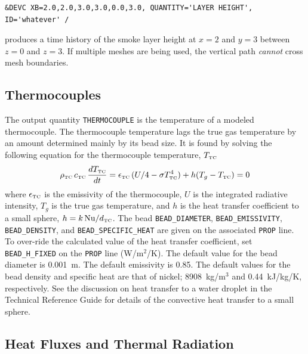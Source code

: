 \documentclass[11pt]{book}
\newcommand{\ct}{\tt\small}
\newcommand{\be}{\begin{equation}}
\newcommand{\ee}{\end{equation}}
\newcommand{\NU}{\hbox{Nu}}
\begin{document}
\footnotesize
\begin{verbatim}
&DEVC XB=2.0,2.0,3.0,3.0,0.0,3.0, QUANTITY='LAYER HEIGHT', ID='whatever' /
\end{verbatim}
\normalsize

\noindent
produces a time history of the smoke layer height at $x=2$ and $y=3$ between $z=0$ and $z=3$.
If multiple meshes are being used, the vertical path {\em cannot} cross mesh boundaries.



\subsection{Thermocouples}
\label{info:THERMOCOUPLE}

The output quantity {\ct THERMOCOUPLE} is the temperature of a modeled thermocouple. The thermocouple temperature lags the true gas temperature by an amount determined mainly
by its bead size. It is found by solving the following equation for the thermocouple temperature, $T_{\hbox{\tiny TC}}$~\cite{Welsh:1}
\be
   \rho_{\hbox{\tiny TC}} \, c_{\hbox{\tiny TC}} \, \frac{dT_{\hbox{\tiny TC}}}{dt} = \epsilon_{\hbox{\tiny TC}} \, (U/4 - \sigma T_{\hbox{\tiny TC}}^4) + h(T_g - T_{\hbox{\tiny TC}}) = 0
   \label{TC}
\ee
where $\epsilon_{\hbox{\tiny TC}}$ is the emissivity of the thermocouple, $U$ is the integrated radiative intensity, $T_g$ is the true gas temperature, and
$h$ is the heat transfer coefficient to a small sphere,
$h=k \, \NU / d_{\hbox{\tiny TC}}$.
The bead {\ct BEAD\_DIAMETER}, {\ct BEAD\_EMISSIVITY}, {\ct BEAD\_DENSITY}, and {\ct BEAD\_SPECIFIC\_HEAT} are given on the associated {\ct PROP} line. To over-ride the
calculated value of the heat transfer coefficient, set {\ct BEAD\_H\_FIXED} on the {\ct PROP} line (W/m$^2$/K).
The default value for the bead diameter is 0.001~m. The default emissivity is 0.85. The default values for the bead density and specific heat are that of nickel; 8908~kg/m$^3$ and
0.44~kJ/kg/K, respectively.
See the discussion on heat transfer to a water
droplet in the Technical Reference Guide for details of the convective
heat transfer to a small sphere.


\subsection{Heat Fluxes and Thermal Radiation}
\label{info:heat_flux}
\end{document}
